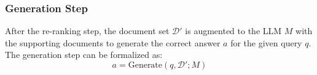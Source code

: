 






\subsubsection{Generation Step}
\label{Generation Step}
After the re-ranking step, the document set $\mathcal{D'}$ is augmented to the LLM $M$ with the supporting documents to generate the correct answer $a$ for the given query $q$. The generation step can be formalized as:
\[
 a=\text{Generate}(q, \mathcal{D'}; M)
\]

